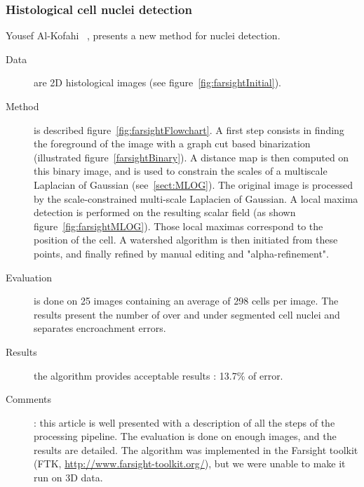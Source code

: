 \subsubsection*{Histological cell nuclei detection}
\label{sect:farsight}
Yousef Al-Kofahi {\etal}~\cite{al2009improved}, presents a new method for nuclei detection.
  \begin{description}
  \item[Data] are 2D histological images (see figure~\ref{fig:farsightInitial}).
  \item[Method] is described figure~\ref{fig:farsightFlowchart}.
  A first step consists in finding the foreground of the image with a graph cut based binarization (illustrated figure~\ref{farsightBinary}).
  A distance map is then computed on this binary image, and is used to constrain the scales of a multiscale Laplacian of Gaussian (see~\ref{sect:MLOG}).
  The original image is processed by the scale-constrained multi-scale Laplacien of Gaussian.
  A local maxima detection is performed on the resulting scalar field (as shown figure~\ref{fig:farsightMLOG}).
  Those local maximas correspond to the position of the cell.
  A watershed algorithm is then initiated from these points, and finally refined by manual editing and "alpha-refinement".
  \item[Evaluation] is done on 25 images containing an average of 298 cells per image. The results present the number of over and under segmented cell nuclei and separates encroachment errors.
  \item[Results] the algorithm provides acceptable results : 13.7\% of error.
  \item[Comments]: this article is well presented with a description of all the steps of the processing pipeline.
  The evaluation is done on enough images, and the results are detailed.
  The algorithm was implemented in the Farsight toolkit (FTK, \url{http://www.farsight-toolkit.org/}), but we were unable to make it run on 3D data.
\end{description}
